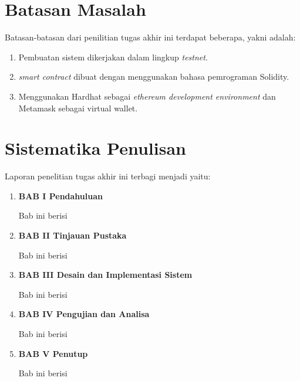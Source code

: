 \section{Batasan Masalah}
\label{sec:batasanmasalah}

Batasan-batasan dari penilitian tugas akhir ini terdapat beberapa, yakni adalah:

\begin{enumerate}[nolistsep]

  \item Pembuatan sistem dikerjakan dalam lingkup \emph{testnet}.

  \item \emph{smart contract} dibuat dengan menggunakan bahasa pemrograman Solidity.

  \item Menggunakan Hardhat sebagai \emph{ethereum development environment} dan Metamask sebagai virtual wallet. 

\end{enumerate}

\section{Sistematika Penulisan}
\label{sec:sistematikapenulisan}

Laporan penelitian tugas akhir ini terbagi menjadi \lipsum[1][1-3] yaitu:

\begin{enumerate}[nolistsep]

  \item \textbf{BAB I Pendahuluan}

        Bab ini berisi \lipsum[2][1-5]

        \vspace{2ex}

  \item \textbf{BAB II Tinjauan Pustaka}

        Bab ini berisi \lipsum[3][1-5]

        \vspace{2ex}

  \item \textbf{BAB III Desain dan Implementasi Sistem}

        Bab ini berisi \lipsum[4][1-5]

        \vspace{2ex}

  \item \textbf{BAB IV Pengujian dan Analisa}

        Bab ini berisi \lipsum[5][1-5]

        \vspace{2ex}

  \item \textbf{BAB V Penutup}

        Bab ini berisi \lipsum[6][1-5]

\end{enumerate}
